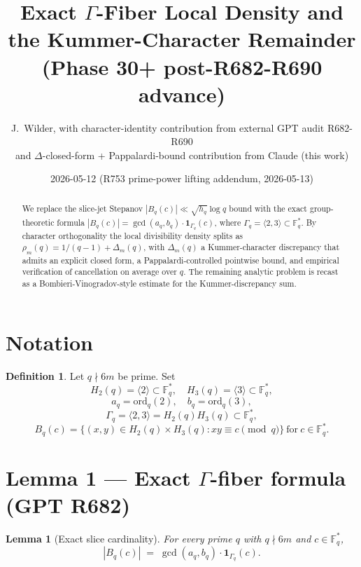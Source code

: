 \documentclass[12pt]{amsart}
\title{Exact $\Gamma$-Fiber Local Density and the Kummer-Character Remainder\\
{\small (Phase 30+ post-R682-R690 advance)}}
\author{J.\ Wilder, with character-identity contribution from external GPT audit R682-R690\\
and $\Delta$-closed-form + Pappalardi-bound contribution from Claude (this work)}
\date{2026-05-12 (R753 prime-power lifting addendum, 2026-05-13)}
\newtheorem{lemma}{Lemma}
\theoremstyle{definition}
\newtheorem{definition}{Definition}
\theoremstyle{remark}
\begin{document}
\maketitle

\begin{abstract}
We replace the slice-jet Stepanov $|B_q(c)| \ll \sqrt{h_q}\log q$ bound with the exact
group-theoretic formula $|B_q(c)| = \gcd(a_q, b_q) \cdot \mathbf{1}_{\Gamma_q}(c)$,
where $\Gamma_q = \langle 2, 3 \rangle \subset \mathbb{F}_q^*$. By character orthogonality
the local divisibility density splits as $\rho_m(q) = 1/(q-1) + \Delta_m(q)$, with
$\Delta_m(q)$ a Kummer-character discrepancy that admits an explicit closed form,
a Pappalardi-controlled pointwise bound, and empirical verification of cancellation
on average over $q$. The remaining analytic problem is recast as a
Bombieri-Vinogradov-style estimate for the Kummer-discrepancy sum.
\end{abstract}

\section{Notation}

\begin{definition}
Let $q \nmid 6m$ be prime. Set
$$
H_2(q) = \langle 2 \rangle \subset \mathbb{F}_q^*, \quad H_3(q) = \langle 3 \rangle \subset \mathbb{F}_q^*,
$$
$$
a_q = \mathrm{ord}_q(2), \quad b_q = \mathrm{ord}_q(3),
$$
$$
\Gamma_q = \langle 2, 3 \rangle = H_2(q) H_3(q) \subset \mathbb{F}_q^*,
$$
$$
B_q(c) = \{(x, y) \in H_2(q) \times H_3(q) : x y \equiv c \pmod q\}\ \text{for}\ c \in \mathbb{F}_q^*.
$$
\end{definition}

\section{Lemma 1 --- Exact $\Gamma$-fiber formula (GPT R682)}

\begin{lemma}[Exact slice cardinality]\label{lem:R682}
For every prime $q$ with $q \nmid 6m$ and $c \in \mathbb{F}_q^*$,
$$
|B_q(c)|
\;=\;
\gcd(a_q, b_q) \cdot \mathbf{1}_{\Gamma_q}(c).
$$
\end{lemma}
\end{document}
